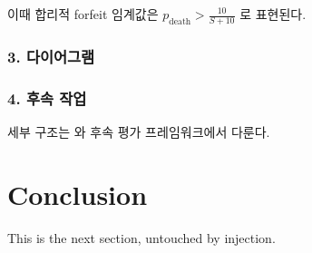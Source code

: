 \documentclass[11pt]{article}
\begin{document}
이때 합리적 forfeit 임계값은 \textcolor{gistred}{\(p_{\text{death}} > \tfrac{10}{S+10}\)} 로 표현된다.

\subsubsection{3. 다이어그램}\label{ux-b2e4uxc774uxc5b4uxadf8uxb7a8}

\begin{center}
\end{center}

\subsubsection{4. 후속 작업}\label{ux-d6c4uxc18d-uxc791uxc5c5}

세부 구조는 \citep{brown2020language} 와 후속 평가 프레임워크에서 다룬다.

\section{Conclusion}
This is the next section, untouched by injection.


\end{document}
